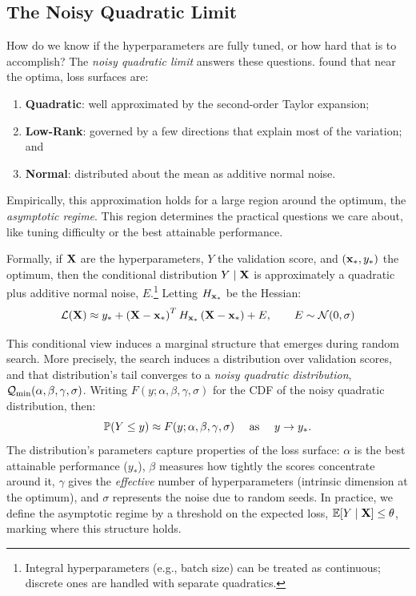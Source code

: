 \subsection{The Noisy Quadratic Limit}
\label{app:background:the-noisy-quadratic-limit}

How do we know if the hyperparameters are fully tuned, or how hard that is to accomplish? The \emph{noisy quadratic limit} answers these questions. \citet{lourie2025hyperparameter} found that near the optima, loss surfaces are:
%
\begin{enumerate}[noitemsep]
    \item \textbf{Quadratic}: well approximated by the second-order Taylor expansion;
    \item \textbf{Low-Rank}: governed by a few directions that explain most of the variation; and
    \item \textbf{Normal}: distributed about the mean as additive normal noise.
\end{enumerate}
%
Empirically, this approximation holds for a large region around the optimum, the \emph{asymptotic regime}. This region determines the practical questions we care about, like tuning difficulty or the best attainable performance.

Formally, if $\mathbf{X}$ are the hyperparameters, $Y$ the validation score, and $(\mathbf{x}_*, y_*)$ the optimum, then the conditional distribution $Y\mid\mathbf{X}$ is approximately a quadratic plus additive normal noise, $E$.\footnote{
    Integral hyperparameters (e.g., batch size) can be treated as continuous; discrete ones are handled with separate quadratics.
} Letting $H_{\mathbf{x}_*}$ be the Hessian:
%
\begin{equation}\label{eq:noisy-quadratic-structure}
    \mathcal{L}(\mathbf{X}) \approx y_* + \left(\mathbf{X} - \mathbf{x}_*\right)^T H_{\mathbf{x}_*} \left(\mathbf{X} - \mathbf{x}_*\right) + E, \qquad E \sim \mathcal{N}(0, \sigma)
\end{equation}

This conditional view induces a marginal structure that emerges during random search. More precisely, the search induces a distribution over validation scores, and that distribution's tail converges to a \textit{noisy quadratic distribution}, $\mathcal{Q}_{\min}(\alpha, \beta, \gamma, \sigma)$. Writing $F(y; \alpha, \beta, \gamma, \sigma)$ for the CDF of the noisy quadratic distribution, then:
%
\begin{equation}\label{eq:noisy-quadratic-limit}
    \mathbb{P}(Y \leq y) \approx F(y; \alpha, \beta, \gamma, \sigma) \quad\text{ as }\quad y \to y_*.
\end{equation}
%
The distribution's parameters capture properties of the loss surface: $\alpha$ is the best attainable performance ($y_*$), $\beta$ measures how tightly the scores concentrate around it, $\gamma$ gives the \textit{effective} number of hyperparameters (intrinsic dimension at the optimum), and $\sigma$ represents the noise due to random seeds. In practice, we define the asymptotic regime by a threshold on the expected loss, $\mathbb{E}[Y\mid\mathbf{X}] \leq \theta$, marking where this structure holds.


